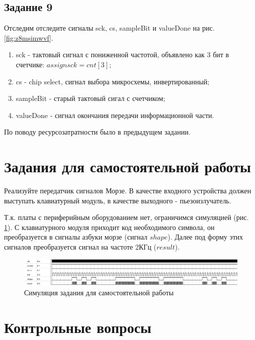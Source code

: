 \documentclass[a4paper,14pt]{article}
\begin{document}
	\subsection{Задание 9}
	
	Отследим отследите сигналы sck, cs, sampleBit и valueDone на рис. \ref{fig:z8msimwvf}.
	
	\begin{enumerate}
		
		\item sck - тактовый сигнал с пониженной частотой, объявлено как 3 бит в счетчике: $assign sck = cnt [3]$;
		
		\item cs - chip select, сигнал выбора микросхемы, инвертированный;
		
		\item sampleBit - старый тактовый сигал с счетчиком;
		
		\item valueDone - сигнал окончания передачи информационной части.
	\end{enumerate}

	По поводу ресурсозатратности было в предыдущем задании.
	
	\section{Задания для самостоятельной работы}

	Реализуйте передатчик сигналов Морзе. В качестве входного устройства должен выступать клавиатурный модуль, в качестве выходного - пьезоизлучатель.
	
	Т.к. платы с периферийным оборудованием нет, ограничимся симуляцией (рис. \ref{fig:extraimg}). С клавиатурного модуля приходит код необходимого символа, он преобразуется в сигналы азбуки морзе (сигнал $shape$). Далее под форму этих сигналов преобразуется сигнал на частоте 2КГц ($result$).
	
	\begin{figure}[H]
		\centering
		\includegraphics[width=0.9\linewidth]{images/extra_img}
		\caption{Симуляция задания для самостоятельной работы}
		\label{fig:extraimg}
	\end{figure}
	
	

	\section{Контрольные вопросы}
	
\end{document}
